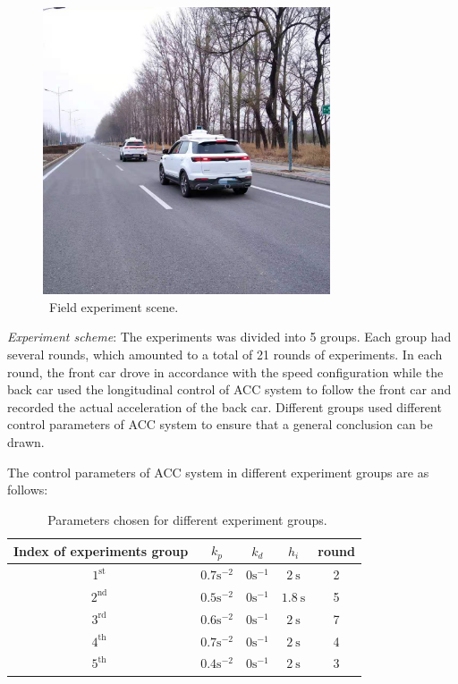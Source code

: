 \documentclass[journal]{IEEEtran}
\begin{document}
\begin{figure}
  \centering
  \includegraphics[width=8.5cm]{figs/experiment.jpg}
  \caption{~Field experiment scene.}
  \label{experiment}
\end{figure}

\textit{Experiment scheme}: The experiments was divided into 5 groups. Each group had several rounds, which amounted to a total of 21 rounds of experiments. In each round, the front car drove in accordance with the speed configuration while the back car used the longitudinal control of ACC system to follow the front car and recorded the actual acceleration of the back car. Different groups used different control parameters of ACC system to ensure that a general conclusion can be drawn.

The control parameters of ACC system in different experiment groups are as follows:
\begin{table}
  \caption{~Parameters chosen for different experiment groups.}
  \begin{tabular}{ccccc}
    \hline Index of experiments group & $k_{p}$               & $k_{d}$              & $h_{i}$           & round \\
    \hline $1^{\text {st }}$          & $0.7 \mathrm{s}^{-2}$ & $0  \mathrm{s}^{-1}$ & $2 \mathrm{~s}$   & 2     \\
    \hline $2^{\text {nd }}$          & $0.5 \mathrm{s}^{-2}$ & $0  \mathrm{s}^{-1}$ & $1.8 \mathrm{~s}$ & 5     \\
    \hline $3^{\text {rd }}$          & $0.6 \mathrm{s}^{-2}$ & $0  \mathrm{s}^{-1}$ & $2 \mathrm{~s}$   & 7     \\
    \hline $4^{\text {th }}$          & $0.7 \mathrm{s}^{-2}$ & $0  \mathrm{s}^{-1}$ & $2 \mathrm{~s}$   & 4     \\
    \hline $5^{\text {th }}$          & $0.4 \mathrm{s}^{-2}$ & $0  \mathrm{s}^{-1}$ & $2 \mathrm{~s}$   & 3     \\
    \hline
  \end{tabular}
  \label{table 2}
\end{table}
\end{document}

